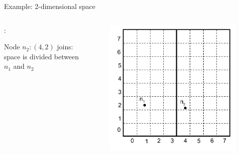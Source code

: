 \begin{frame}{Example: 2-dimensional space}

\begin{columns}
\begin{column}{0.5\textwidth}
:\\
\BI
\item Node $n_2:(4, 2)$ joins: space is divided between $n_1$ and $n_2$
\EI
\end{column}
\begin{column}{0.5\textwidth}
\begin{figure}
	\includegraphics[width=1.0\textwidth]{can2}
\end{figure}
\end{column}
\end{columns}
		
\end{frame}	

